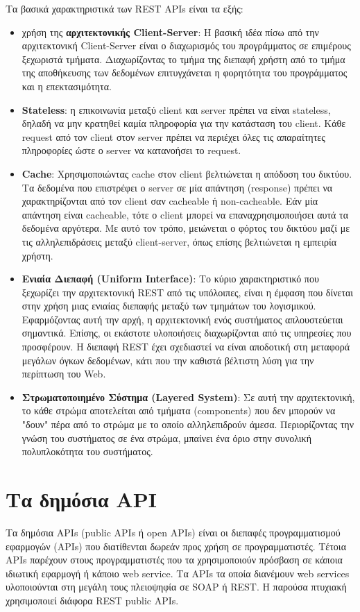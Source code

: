 \documentclass[oneside, 12pt]{book}
\begin{document}
Τα βασικά χαρακτηριστικά των REST APIs είναι τα εξής:
\begin{itemize}
    \item χρήση της \textbf{αρχιτεκτονικής Client-Server}:
    Η βασική ιδέα πίσω από την αρχιτεκτονική Client-Server είναι ο 
    διαχωρισμός του προγράμματος σε επιμέρους ξεχωριστά τμήματα.
    Διαχωρίζοντας το τμήμα της διεπαφή χρήστη από το τμήμα της 
    αποθήκευσης των δεδομένων επιτυγχάνεται η φορητότητα του 
    προγράμματος και η επεκτασιμότητα.
    \item \textbf{Stateless}: η επικοινωνία μεταξύ client και server 
    πρέπει να είναι stateless, δηλαδή να μην κρατηθεί καμία πληροφορία 
    για την κατάσταση του client. Κάθε request από τον client στον 
    server πρέπει να περιέχει όλες τις απαραίτητες πληροφορίες ώστε ο 
    server να κατανοήσει το request.
    \item \textbf{Cache}: Χρησιμοποιώντας cache στον client 
    βελτιώνεται η απόδοση του δικτύου. Τα δεδομένα που επιστρέφει ο 
    server σε μία απάντηση (response) πρέπει να χαρακτηρίζονται από 
    τον client σαν cacheable ή non-cacheable. Εάν μία απάντηση είναι 
    cacheable, τότε ο client μπορεί να επαναχρησιμοποιήσει αυτά τα 
    δεδομένα αργότερα. Με αυτό τον τρόπο, μειώνεται ο φόρτος του 
    δικτύου μαζί με τις αλληλεπιδράσεις μεταξύ client-server, όπως 
    επίσης βελτιώνεται η εμπειρία χρήστη.
    \item \textbf{Ενιαία Διεπαφή (Uniform Interface)}: Το κύριο 
    χαρακτηριστικό που ξεχωρίζει την αρχιτεκτονική REST από τις 
    υπόλοιπες, είναι η έμφαση που δίνεται στην χρήση μιας ενιαίας 
    διεπαφής μεταξύ των τμημάτων του λογισμικού. Εφαρμόζοντας αυτή την 
    αρχή, η αρχιτεκτονική ενός συστήματος απλουστεύεται σημαντικά. 
    Επίσης, οι εκάστοτε υλοποιήσεις διαχωρίζονται από τις υπηρεσίες που 
    προσφέρουν. Η διεπαφή REST έχει σχεδιαστεί να είναι αποδοτική στη 
    μεταφορά μεγάλων όγκων δεδομένων, κάτι που την καθιστά βέλτιστη 
    λύση για την περίπτωση του Web.
    \item \textbf{Στρωματοποιημένο Σύστημα (Layered System)}:
    Σε αυτή την αρχιτεκτονική, το κάθε στρώμα αποτελείται από τμήματα 
    (components) που δεν μπορούν να "δουν" πέρα από το στρώμα με το 
    οποίο αλληλεπιδρούν άμεσα. Περιορίζοντας την γνώση του συστήματος 
    σε ένα στρώμα, μπαίνει ένα όριο στην συνολική πολυπλοκότητα του 
    συστήματος.
\end{itemize}
\cite{fielding_rest}

\section{Τα δημόσια API}
Τα δημόσια APIs (public APIs ή open APIs) είναι οι διεπαφές 
προγραμματισμού εφαρμογών (APIs) που διατίθενται δωρεάν προς χρήση σε 
προγραμματιστές.
Τέτοια APIs παρέχουν στους προγραμματιστές που τα χρησιμοποιούν 
πρόσβαση σε κάποια ιδιωτική εφαρμογή ή κάποιο web service.
Τα APIs τα οποία διανέμουν web services υλοποιούνται στη μεγάλη τους 
πλειοψηφία σε SOAP ή REST. Η παρούσα πτυχιακή χρησιμοποιεί διάφορα 
REST public APIs.
\end{document}
